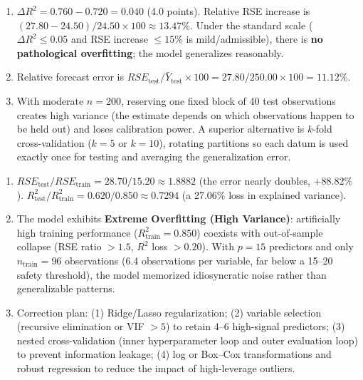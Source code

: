 \begin{solproblema}[prob:7d813ee]
\begin{enumerate}
\item $\Delta R^2=0.760-0.720=0.040$ (4.0 points). Relative RSE increase is $(27.80-24.50)/24.50\times100\approx13.47\%$. Under the standard scale ($\Delta R^2\le0.05$ and RSE increase $\le15\%$ is mild/admissible), there is \textbf{no pathological overfitting}; the model generalizes reasonably.
\item Relative forecast error is $RSE_{\text{test}}/\bar Y_{\text{test}}\times100=27.80/250.00\times100=11.12\%$.
\item With moderate $n=200$, reserving one fixed block of 40 test observations creates high variance (the estimate depends on which observations happen to be held out) and loses calibration power. A superior alternative is $k$-fold cross-validation ($k=5$ or $k=10$), rotating partitions so each datum is used exactly once for testing and averaging the generalization error.
\end{enumerate}
\end{solproblema}

\begin{solproblema}[prob:d0d57bc]
\begin{enumerate}
\item $RSE_{\text{test}}/RSE_{\text{train}}=28.70/15.20\approx1.8882$ (the error nearly doubles, $+88.82\%$). $R^2_{\text{test}}/R^2_{\text{train}}=0.620/0.850\approx0.7294$ (a 27.06\% loss in explained variance).
\item The model exhibits \textbf{Extreme Overfitting (High Variance)}: artificially high training performance ($R^2_{\text{train}}=0.850$) coexists with out-of-sample collapse (RSE ratio $>1.5$, $R^2$ loss $>0.20$). With $p=15$ predictors and only $n_{\text{train}}=96$ observations (6.4 observations per variable, far below a 15--20 safety threshold), the model memorized idiosyncratic noise rather than generalizable patterns.
\item Correction plan: (1) Ridge/Lasso regularization; (2) variable selection (recursive elimination or VIF $>5$) to retain 4--6 high-signal predictors; (3) nested cross-validation (inner hyperparameter loop and outer evaluation loop) to prevent information leakage; (4) log or Box--Cox transformations and robust regression to reduce the impact of high-leverage outliers.
\end{enumerate}
\end{solproblema}


